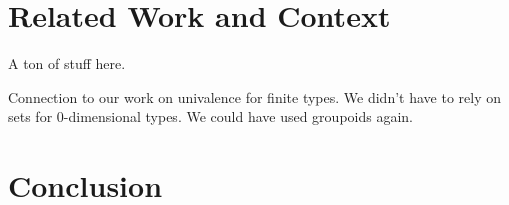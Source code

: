 \documentclass[authoryear,preprint]{sigplanconf}
\begin{document}
\section{Related Work and Context}

A ton of stuff here. 

Connection to our work on univalence for finite types. We didn't have to rely
on sets for 0-dimensional types. We could have used groupoids again. 

\section{Conclusion}


\softraggedright

\end{document}
